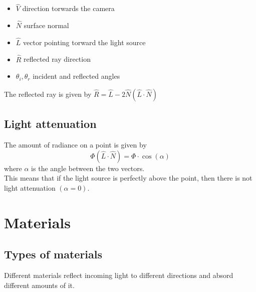 \documentclass{article}
\begin{document}
\begin{itemize}
    \item \(\hat{V}\) direction torwards the camera
    \item \(\hat{N}\) surface normal
    \item \(\hat{L}\) vector pointing torward the light source
    \item \(\hat{R}\) reflected ray direction
    \item \({\theta}_i, {\theta}_r\) incident and reflected angles
\end{itemize}

The reflected ray is given by \(\hat{R}=\hat{L}-2\hat{N}(\hat{L}\cdot\hat{N})\)

\subsection{Light attenuation}

The amount of radiance on a point is given by
\[
    \Phi \left(\hat{L} \cdot \hat{N}\right) = \Phi \cdot \cos(\alpha)
\]
where \(\alpha\) is the angle between the two vectors.
\\
This means that if the light source is perfectly above the point, then
there is not light attenuation \((\alpha = 0)\).

\pagebreak

\section{Materials}

\subsection{Types of materials}

Different materials reflect incoming light to different directions and absord different amounts of it.
\end{document}
